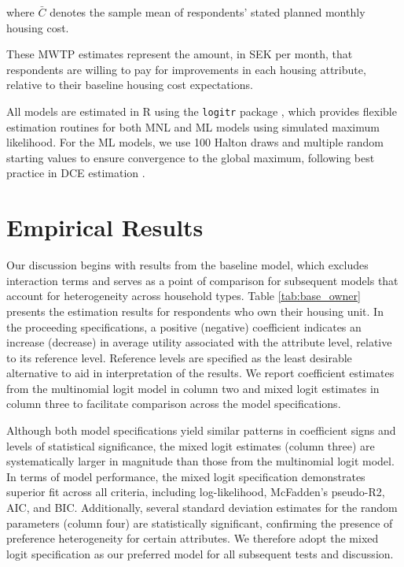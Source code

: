 \documentclass[3p,11pt ]{elsarticle}
\begin{document}
\noindent where $\bar{C}$ denotes the sample mean of respondents' stated planned monthly housing cost.

These MWTP estimates represent the amount, in SEK per month, that respondents are willing to pay for improvements in each housing attribute, relative to their baseline housing cost expectations. 

All models are estimated in R using the \texttt{logitr} package \citep{helvestonLogitrFastEstimation2023}, which provides flexible estimation routines for both MNL and ML models using simulated maximum likelihood.
For the ML models,
we use 100 Halton draws and multiple random starting values to ensure convergence to the global maximum, following best practice in DCE estimation \citep{trainDiscreteChoiceMethods2003}.




\section{Empirical Results}

Our discussion begins with results from the baseline model, which excludes interaction terms and serves as a point of comparison for subsequent models that account for heterogeneity across household types.
Table \ref{tab:base_owner} presents the estimation results for respondents who own their housing unit.
In the proceeding specifications, a positive (negative) coefficient indicates an increase (decrease) in average utility associated with the attribute level, relative to its reference level.
Reference levels are specified as the least desirable alternative to aid in interpretation of the results.
We report coefficient estimates from the multinomial logit model in column two and mixed logit estimates in column three  to facilitate comparison across the model specifications.




Although both model specifications yield similar patterns in coefficient signs and levels of statistical significance,
the mixed logit estimates (column three) are systematically larger in magnitude than those from the multinomial logit model.
In terms of model performance,
the mixed logit specification demonstrates superior fit across all criteria, including log-likelihood, McFadden's pseudo-R2, AIC, and BIC.
Additionally, several standard deviation estimates for the random parameters (column four) are statistically significant, confirming the presence of preference heterogeneity for certain attributes.
We therefore adopt the mixed logit specification as our preferred model for all subsequent tests and discussion.
\end{document}

